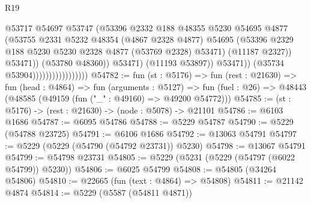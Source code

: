 \begin{lexlean}{R19}
\begin{coremodule}
                                                @53717
                                                @54697
                                                @53747
                                                (@53396
                                                  @2332
                                                  @188
                                                  @48355
                                                  @5230
                                                  @54695
                                                  @4877
                                                  (@53755
                                                    @2331
                                                    @5232
                                                    @48354
                                                    (@4867 @2328 @4877)
                                                    @54695
                                                    (@53396
                                                      @2329
                                                      @188
                                                      @5230
                                                      @5230
                                                      @2328
                                                      @4877
                                                      (@53769 @2328)
                                                      @53471)
                                                    (@11187 @2327))
                                                  @53471))
                                              (@53780 @48360))
                                            @53471)
                                          (@11193 @53897))
                                        @53471))
                                    (@35734 @53904)))))))))))))))))
@54782 := fun (st : @5176) =>
  fun (rest : @21630) =>
  fun (head : @4864) =>
  fun (arguments : @5127) =>
  fun (fuel : @26) => @48443 (@48585 (@49159 (fun ("_" : @49160) => @49200 @54772)))
@54785 := (st : @5176) -> (rest : @21630) -> (node : @5078) -> @21101
@54786 := @6103 @1686
@54787 := @6095 @54786
@54788 := @5229 @54787
@54790 := @5229 (@54788 @23725)
@54791 := @6106 @1686
@54792 := @13063 @54791
@54797 := @5229 (@5229 (@54790 (@54792 @23731)) @5230)
@54798 := @13067 @54791
@54799 := @54798 @23731
@54805 := @5229 (@5231 (@5229 (@54797 (@6022 @54799)) @5230))
@54806 := @6025 @54799
@54808 := @54805 (@34264 @54806)
@54810 := @22665 (fun (text : @4864) => @54808)
@54811 := @21142 @4874
@54814 := @5229 (@5587 (@54811 @4871))

\end{coremodule}
\end{lexlean}
